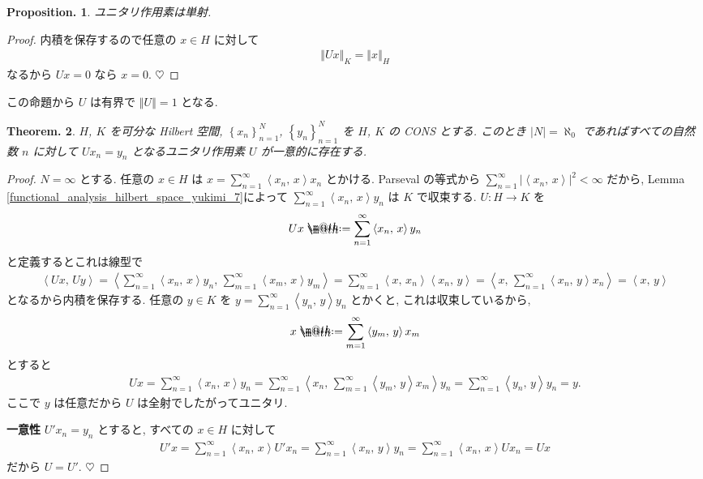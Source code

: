 \documentclass[openany, a4paper, oneside]{book}
\makeatletter
\newcommand*{\defeq}{\mathrel{\rlap{%
\raisebox{0.3ex}{$\m@th\cdot$}}%
\raisebox{-0.3ex}{$\m@th\cdot$}}%
=}
\theoremstyle{break}
\newtheorem{thm}{Theorem.}[section]
\newtheorem{prop}[thm]{Proposition.}
\theoremstyle{breakdefn}
\newcommand{\abs}[1]{\left|#1\right|}
\newcommand{\norm}[1]{\left\Vert#1\right\Vert}
\newcommand{\cbk}[1]{\left\{#1\right\}}
\newcommand{\bkt}[2]{\left\langle#1,\,#2\right\rangle}
\makeatother
\begin{document}
\begin{prop}
 ユニタリ作用素は単射.
\end{prop}
\begin{proof}
内積を保存するので任意の $x \in H$ に対して
\begin{align}
 \norm{Ux}_K
 =
 \norm{x}_H
\end{align}
なるから $Ux = 0$ なら $x = 0$.
$\heartsuit$
\end{proof}
この命題から $U$ は有界で $\norm{U} = 1$ となる.

\begin{thm}\label{functional_analysis_hilbert_space_yukimi_12}
 $H$, $K$ を可分な Hilbert 空間, $\cbk{x_n}_{n=1}^N$, $\cbk{y_n}_{n=1}^N$ を $H$, $K$ の CONS とする.
 このとき $\abs{N} = \aleph_0$ であればすべての自然数 $n$ に対して $Ux_n = y_n$ となるユニタリ作用素 $U$ が一意的に存在する.
\end{thm}
\begin{proof}
$N = \infty$ とする.
任意の $x \in H$ は $x = \sum_{n=1}^\infty \bkt{x_n}{x} x_n$ とかける.
Parseval の等式から $\sum_{n=1}^\infty \abs{\bkt{x_n}{x}}^2 < \infty$ だから,
Lemma \ref{functional_analysis_hilbert_space_yukimi_7}によって $\sum_{n=1}^\infty \bkt{x_n}{x} y_n$ は $K$ で収束する.
$U \colon H \to K$ を
\begin{align}
 Ux
 \defeq
 \sum_{n=1}^\infty \bkt{x_n}{x} y_n
\end{align}
と定義するとこれは線型で
\begin{align}
 \bkt{Ux}{Uy}
 =
 \bkt{\sum_{n=1}^{\infty} \bkt{x_n}{x} y_n}{\sum_{m=1}^{\infty} \bkt{x_m}{x} y_m}
 =
 \sum_{n=1}^{\infty} \bkt{x}{x_n} \bkt{x_n}{y}
 =
 \bkt{x}{\sum_{n=1}^{\infty} \bkt{x_n}{y} x_n}
 =
 \bkt{x}{y}
\end{align}
となるから内積を保存する.
任意の $y \in K$ を $y = \sum_{n=1}^{\infty} \bkt{y_n}{y} y_n$ とかくと, これは収束しているから,
\begin{align}
 x
 \defeq
 \sum_{m=1}^{\infty} \bkt{y_m}{y} x_m
\end{align}
とすると
\begin{align}
 U x
 =
 \sum_{n=1}^{\infty} \bkt{x_n}{x} y_n
 =
 \sum_{n=1}^{\infty} \bkt{x_n}{\sum_{m=1}^{\infty} \bkt{y_m}{y} x_m} y_n
 =
 \sum_{n=1}^{\infty} \bkt{y_n}{y} y_n
 =
 y.
\end{align}
ここで $y$ は任意だから $U$ は全射でしたがってユニタリ.

\textbf{一意性}
$U'x_n = y_n$ とすると, すべての $x \in H$ に対して
\begin{align}
 U'x
 =
 \sum_{n=1}^{\infty} \bkt{x_n}{x} U' x_n
 =
 \sum_{n=1}^{\infty} \bkt{x_n}{y} y_n
 =
 \sum_{n=1}^{\infty} \bkt{x_n}{x} Ux_n
 =
 Ux
\end{align}
だから $U = U'$.
$\heartsuit$
\end{proof}
\end{document}
